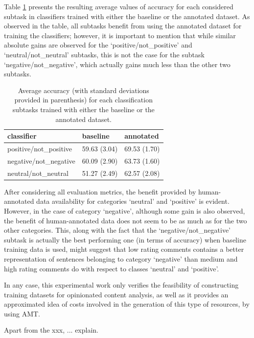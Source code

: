 \documentclass[11pt,letterpaper]{article}
\begin{document}
Table \ref{tc_accu} presents the resulting average values of accuracy for each considered subtask 
in classifiers trained with either the baseline or the annotated dataset. As observed in the table,
all subtasks benefit from using the annotated dataset for training the classifiers; however, it is 
important to mention that while similar absolute gains are observed for the `positive/not\_positive' 
and `neutral/not\_neutral' subtasks, this is not the case for the subtask `negative/not\_negative', 
which actually gains much less than the other two subtasks.

\begin{table}
\begin{tabular}{|l|l|l|}
\hline
classifier &baseline &annotated \\ 
\hline
positive/not\_positive &59.63 (3.04) &69.53 (1.70) \\ 
\hline
negative/not\_negative &60.09 (2.90) &63.73 (1.60) \\ 
\hline
neutral/not\_neutral &51.27 (2.49) &62.57 (2.08) \\ 
\hline
\end{tabular}
\caption{Average accuracy (with standard deviations provided in parenthesis) 
for each classification subtasks trained with either the baseline or the annotated dataset.}
\label{tc_accu}
\end{table}

After considering all evaluation metrics, the benefit provided by human-annotated data 
availability for categories `neutral' and `positive' is evident. However, in the case of category `negative', although some 
gain is also observed, the benefit of human-annotated data does not seem to be as much as for the two other 
categories. This, along with the fact that the `negative/not\_negative' subtask is actually the best performing
one (in terms of accuracy) when baseline training data is used, might suggest that low rating comments contains 
a better representation of sentences belonging to category `negative' than medium and high rating comments do with
respect to classes `neutral' and `positive'. 

In any case, this experimental work only verifies the feasibility of constructing training datasets for
opinionated content analysis, as well as it provides an approximated idea of costs involved in the generation
of this type of resources, by using AMT.

Apart from the xxx, ... explain.
\end{document}
